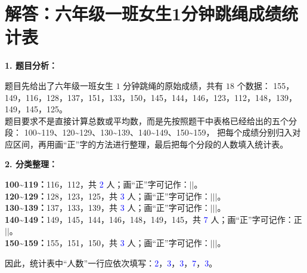 

\newpage

\section{解答：六年级一班女生1分钟跳绳成绩统计表}

\vspace{0.4cm}

\noindent\textbf{1. 题目分析：}

\vspace{0.2cm}

\noindent
题目先给出了六年级一班女生 $1$ 分钟跳绳的原始成绩，共有 $18$ 个数据：
155，149，116，128，137，151，133，150，145，144，146，123，112，148，139，149，145，125。\\[4pt]
题目要求不是直接计算总数或平均数，而是先按照题干中表格已经给出的五个分段：
100\textasciitilde119、120\textasciitilde129、130\textasciitilde139、140\textasciitilde149、150\textasciitilde159，
把每个成绩分别归入对应区间，再用画“正”字的方法进行整理，最后把每个分段的人数填入统计表。

\vspace{0.4cm}

\noindent\textbf{2. 分类整理：}

\vspace{0.2cm}

\noindent
\textbf{100\textasciitilde119：}116，112，共 \textcolor{blue}{2} 人；\quad 画“正”字可记作：$\vert\vert$。\\
\textbf{120\textasciitilde129：}128，123，125，共 \textcolor{blue}{3} 人；\quad 画“正”字可记作：$\vert\vert\vert$。\\
\textbf{130\textasciitilde139：}137，133，139，共 \textcolor{blue}{3} 人；\quad 画“正”字可记作：$\vert\vert\vert$。\\
\textbf{140\textasciitilde149：}149，145，144，146，148，149，145，共 \textcolor{blue}{7} 人；\quad 画“正”字可记作：正$\vert\vert$。\\
\textbf{150\textasciitilde159：}155，151，150，共 \textcolor{blue}{3} 人；\quad 画“正”字可记作：$\vert\vert\vert$。

\vspace{0.4cm}

\noindent
因此，统计表中“人数”一行应依次填写：\textcolor{blue}{2}，\textcolor{blue}{3}，\textcolor{blue}{3}，\textcolor{blue}{7}，\textcolor{blue}{3}。

